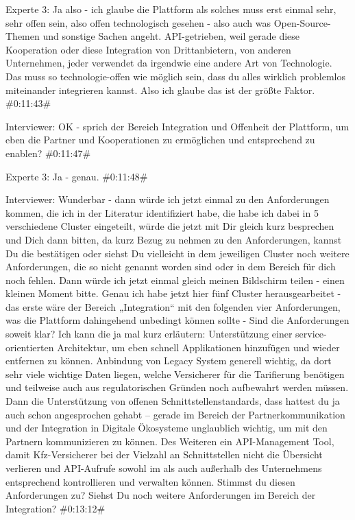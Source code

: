 Experte 3:
Ja also - ich glaube die Plattform als solches muss erst einmal sehr, sehr offen sein, also offen technologisch gesehen - also auch was Open-Source-Themen und sonstige Sachen angeht. API-getrieben, weil gerade diese Kooperation oder diese Integration von Drittanbietern, von anderen Unternehmen, jeder verwendet da irgendwie eine andere Art von Technologie. Das muss so technologie-offen wie möglich sein, dass du alles wirklich problemlos miteinander integrieren kannst. Also ich glaube das ist der größte Faktor.
\#0:11:43\#

Interviewer:
OK - sprich der Bereich Integration und Offenheit der Plattform, um eben die Partner und Kooperationen zu ermöglichen und entsprechend zu enablen? 
\#0:11:47\#

Experte 3:
Ja - genau.
\#0:11:48\#

Interviewer:
Wunderbar - dann würde ich jetzt einmal zu den Anforderungen kommen, die ich in der Literatur identifiziert habe, die habe ich dabei in 5 verschiedene Cluster eingeteilt, würde die jetzt mit Dir gleich kurz besprechen und Dich dann bitten, da kurz Bezug zu nehmen zu den Anforderungen, kannst Du die bestätigen oder siehst Du vielleicht in dem jeweiligen Cluster noch weitere Anforderungen, die so nicht genannt worden sind oder in dem Bereich für dich noch fehlen. Dann würde ich jetzt einmal gleich meinen Bildschirm teilen - einen kleinen Moment bitte. Genau ich habe jetzt hier fünf Cluster herausgearbeitet - das erste wäre der Bereich „Integration“ mit den folgenden vier Anforderungen, was die Plattform dahingehend unbedingt können sollte - Sind die Anforderungen soweit klar? Ich kann die ja mal kurz erläutern: Unterstützung einer service-orientierten Architektur, um eben schnell Applikationen hinzufügen und wieder entfernen zu können. Anbindung von Legacy System generell wichtig, da dort sehr viele wichtige Daten liegen, welche Versicherer für die Tarifierung benötigen und teilweise auch aus regulatorischen Gründen noch aufbewahrt werden müssen. Dann die Unterstützung von offenen Schnittstellenstandards, dass hattest du ja auch schon angesprochen gehabt – gerade im Bereich der Partnerkommunikation und der Integration in Digitale Ökosysteme unglaublich wichtig, um mit den Partnern kommunizieren zu können. Des Weiteren ein API-Management Tool, damit Kfz-Versicherer bei der Vielzahl an Schnittstellen nicht die Übersicht verlieren und API-Aufrufe sowohl im als auch außerhalb des Unternehmens entsprechend kontrollieren und verwalten können. Stimmst du diesen Anforderungen zu? Siehst Du noch weitere Anforderungen im Bereich der Integration?
\#0:13:12\#

